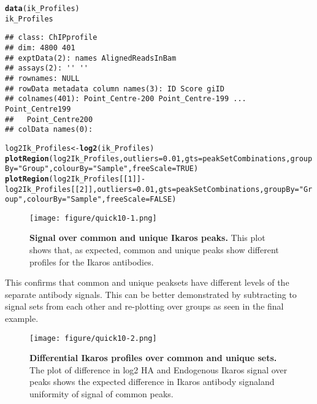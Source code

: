 \documentclass[12pt]{article}\usepackage[]{graphicx}\usepackage[usenames,dvipsnames]{color}
\makeatletter
\newcommand{\hlnum}[1]{\textcolor[rgb]{0.686,0.059,0.569}{#1}}%
\newcommand{\hlstr}[1]{\textcolor[rgb]{0.192,0.494,0.8}{#1}}%
\newcommand{\hlopt}[1]{\textcolor[rgb]{0,0,0}{#1}}%
\newcommand{\hlstd}[1]{\textcolor[rgb]{0.345,0.345,0.345}{#1}}%
\newcommand{\hlkwb}[1]{\textcolor[rgb]{0.69,0.353,0.396}{#1}}%
\newcommand{\hlkwc}[1]{\textcolor[rgb]{0.333,0.667,0.333}{#1}}%
\newcommand{\hlkwd}[1]{\textcolor[rgb]{0.737,0.353,0.396}{\textbf{#1}}}%
\newenvironment{kframe}{%
 \def\at@end@of@kframe{}%
 \ifinner\ifhmode%
  \def\at@end@of@kframe{\end{minipage}}%
  \begin{minipage}{\columnwidth}%
 \fi\fi%
 \def\FrameCommand##1{\hskip\@totalleftmargin \hskip-\fboxsep
 \colorbox{shadecolor}{##1}\hskip-\fboxsep
     \hskip-\linewidth \hskip-\@totalleftmargin \hskip\columnwidth}%
 \MakeFramed {\advance\hsize-\width
   \@totalleftmargin\z@ \linewidth\hsize
   \@setminipage}}%
 {\par\unskip\endMakeFramed%
 \at@end@of@kframe}
\newenvironment{knitrout}{}{} %
\makeatother
\begin{document}
\begin{knitrout}
\color{fgcolor}\begin{kframe}
\begin{alltt}
\hlkwd{data}\hlstd{(ik_Profiles)}
\hlstd{ik_Profiles}
\end{alltt}
\begin{verbatim}
## class: ChIPprofile 
## dim: 4800 401 
## exptData(2): names AlignedReadsInBam
## assays(2): '' ''
## rownames: NULL
## rowData metadata column names(3): ID Score giID
## colnames(401): Point_Centre-200 Point_Centre-199 ... Point_Centre199
##   Point_Centre200
## colData names(0):
\end{verbatim}
\begin{alltt}
\hlstd{log2Ik_Profiles} \hlkwb{<-} \hlkwd{log2}\hlstd{(ik_Profiles)}
\hlkwd{plotRegion}\hlstd{(log2Ik_Profiles,}\hlkwc{outliers}\hlstd{=}\hlnum{0.01}\hlstd{,}\hlkwc{gts}\hlstd{=peakSetCombinations,} \hlkwc{groupBy}\hlstd{=}\hlstr{"Group"}\hlstd{,}\hlkwc{colourBy}\hlstd{=}\hlstr{"Sample"}\hlstd{,} \hlkwc{freeScale}\hlstd{=}\hlnum{TRUE}\hlstd{)}
\hlkwd{plotRegion}\hlstd{(log2Ik_Profiles[[}\hlnum{1}\hlstd{]]} \hlopt{-} \hlstd{log2Ik_Profiles[[}\hlnum{2}\hlstd{]] ,}\hlkwc{outliers}\hlstd{=}\hlnum{0.01}\hlstd{,}\hlkwc{gts}\hlstd{=peakSetCombinations,} \hlkwc{groupBy}\hlstd{=}\hlstr{"Group"}\hlstd{,} \hlkwc{colourBy}\hlstd{=}\hlstr{"Sample"}\hlstd{,} \hlkwc{freeScale}\hlstd{=}\hlnum{FALSE}\hlstd{)}
\end{alltt}
\end{kframe}
\end{knitrout}


\begin{figure}
\centering
\texttt{[image: figure/quick10-1.png]}
\caption{
  \textbf{Signal over common and unique Ikaros peaks.} This plot shows that, as expected, common and unique peaks show different profiles for the Ikaros antibodies.
}
\label{IkExample}
\end{figure}


This confirms that common and unique peaksets have different levels of the separate antibody signals. This can be better demonstrated by subtracting to signal sets from each other and re-plotting over groups as seen in the final example.


\begin{figure}
\centering
\texttt{[image: figure/quick10-2.png]}
\caption{
  \textbf{Differential Ikaros profiles over common and unique sets.} 
  The plot of difference in log2 HA and Endogenous Ikaros signal over peaks shows the expected difference in Ikaros antibody signaland uniformity of signal of common peaks.
}
\label{DiffIkaros}
\end{figure}
\end{document}
